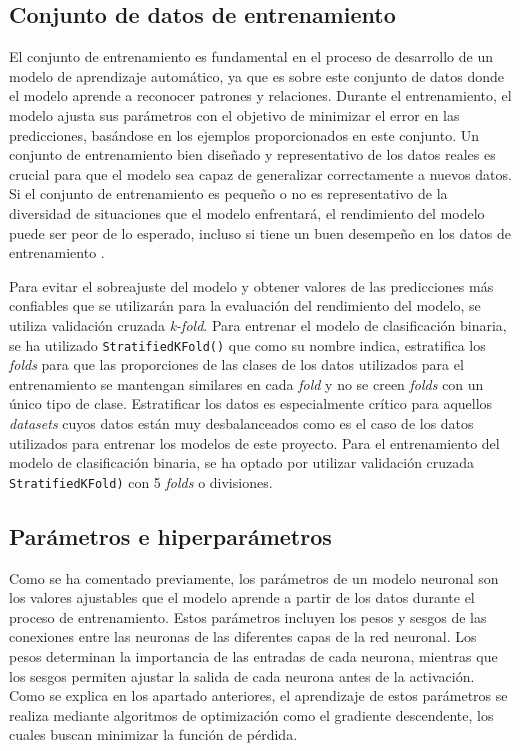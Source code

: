 \subsection{Conjunto de datos de entrenamiento} \label{subsec:conjdatent}
El conjunto de entrenamiento es fundamental en el proceso de desarrollo de un modelo de aprendizaje automático, ya que es sobre este conjunto de datos donde el modelo aprende a reconocer patrones y relaciones. Durante el entrenamiento, el modelo ajusta sus parámetros con el objetivo de minimizar el error en las predicciones, basándose en los ejemplos proporcionados en este conjunto. Un conjunto de entrenamiento bien diseñado y representativo de los datos reales es crucial para que el modelo sea capaz de generalizar correctamente a nuevos datos. Si el conjunto de entrenamiento es pequeño o no es representativo de la diversidad de situaciones que el modelo enfrentará, el rendimiento del modelo puede ser peor de lo esperado, incluso si tiene un buen desempeño en los datos de entrenamiento  \cite{bishop2006pattern}.

Para evitar el sobreajuste del modelo y obtener valores de las predicciones más confiables que se utilizarán para la evaluación del rendimiento del modelo, se utiliza validación cruzada \textit{k-fold}. Para entrenar el modelo de clasificación binaria, se ha utilizado \texttt{StratifiedKFold()} que como su nombre indica, estratifica los \textit{folds} para que las proporciones de las clases de los datos utilizados para el entrenamiento se mantengan similares en cada \textit{fold} y no se creen \textit{folds} con un único tipo de clase. Estratificar los datos es especialmente crítico para aquellos \textit{datasets} cuyos datos están muy desbalanceados como es el caso de los datos utilizados para entrenar los modelos de este proyecto. Para el entrenamiento del modelo de clasificación binaria, se ha optado por utilizar validación cruzada \texttt{StratifiedKFold)} con 5 \textit{folds} o divisiones.


\subsection{Parámetros e hiperparámetros}\label{sec:paramhiper}
Como se ha comentado previamente, los parámetros de un modelo neuronal son los valores ajustables que el modelo aprende a partir de los datos durante el proceso de entrenamiento. Estos parámetros incluyen los pesos y sesgos de las conexiones entre las neuronas de las diferentes capas de la red neuronal. Los pesos determinan la importancia de las entradas de cada neurona, mientras que los sesgos permiten ajustar la salida de cada neurona antes de la activación. Como se explica en los apartado anteriores, el aprendizaje de estos parámetros se realiza mediante algoritmos de optimización como el gradiente descendente, los cuales buscan minimizar la función de pérdida. \cite{goodfellow2016deep}



